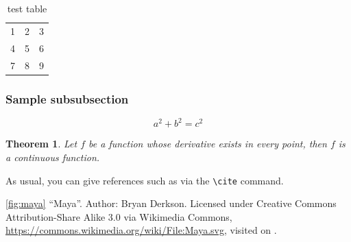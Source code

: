\documentclass{snapshotmfo}
\begin{document}
\begin{table}[ht]
  \caption{test table}
  \begin{tabular}{ l c r }
    1 & 2 & 3 \\
    4 & 5 & 6 \\
    7 & 8 & 9 \\
  \end{tabular}
  \label{tab:dull}
\end{table}

\subsubsection{Sample subsubsection} \label{subsubsec:sample}

\begin{equation}\label{eq:pythagoras}
a^2+b^2=c^2
\end{equation}

\newtheorem{theorem}{Theorem}
\begin{theorem}\label{thm:continuity}
Let $f$ be a function whose derivative exists in every point, then $f$ 
is a continuous function.
\end{theorem}

As usual, you can give references such as \cite{knuth1984texbook, wikiMath, sample13, sample12, sample11, sample14} via the \verb+\cite+ command.

\begin{imagecredits}
  \item[\autoref{fig:maya}] ``Maya''. Author: Bryan Derkson. Licensed under Creative Commons Attribution-Share Alike 3.0 via Wikimedia Commons, \url{https://commons.wikimedia.org/wiki/File:Maya.svg}, visited on .
\end{imagecredits}

\clearpage


\end{document}
